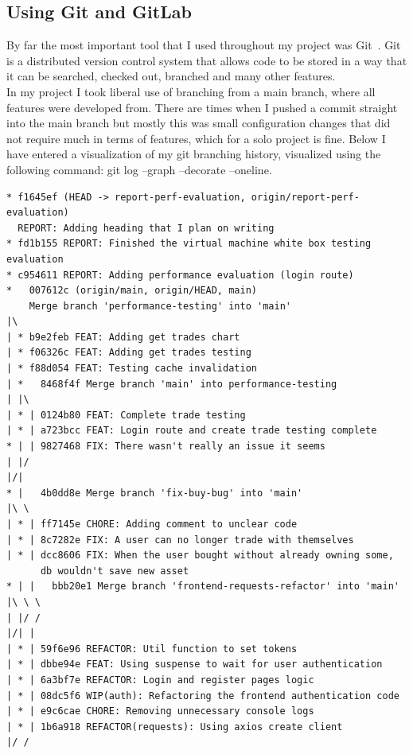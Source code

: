 \documentclass[titlepage]{article}
\begin{document}
\subsection{Using Git and GitLab}
By far the most important tool that I used throughout my project was Git~\cite{git}. Git is a distributed version control system that allows code to be stored in a way that it can be searched, checked out, branched and many other features. \\

In my project I took liberal use of branching from a main branch, where all features were developed from. There are times when I pushed a commit straight into the main branch but mostly this was small configuration changes that did not require much in terms of features, which for a solo project is fine. Below I have entered a visualization of my git branching history, visualized using the following command: git log --graph --decorate --oneline.

\begin{verbatim}
* f1645ef (HEAD -> report-perf-evaluation, origin/report-perf-evaluation) 
  REPORT: Adding heading that I plan on writing
* fd1b155 REPORT: Finished the virtual machine white box testing evaluation
* c954611 REPORT: Adding performance evaluation (login route)
*   007612c (origin/main, origin/HEAD, main) 
    Merge branch 'performance-testing' into 'main'
|\
| * b9e2feb FEAT: Adding get trades chart
| * f06326c FEAT: Adding get trades testing
| * f88d054 FEAT: Testing cache invalidation
| *   8468f4f Merge branch 'main' into performance-testing
| |\
| * | 0124b80 FEAT: Complete trade testing
| * | a723bcc FEAT: Login route and create trade testing complete
* | | 9827468 FIX: There wasn't really an issue it seems
| |/
|/|
* |   4b0dd8e Merge branch 'fix-buy-bug' into 'main'
|\ \
| * | ff7145e CHORE: Adding comment to unclear code
| * | 8c7282e FIX: A user can no longer trade with themselves
| * | dcc8606 FIX: When the user bought without already owning some,
      db wouldn't save new asset
* | |   bbb20e1 Merge branch 'frontend-requests-refactor' into 'main'
|\ \ \
| |/ /
|/| |
| * | 59f6e96 REFACTOR: Util function to set tokens
| * | dbbe94e FEAT: Using suspense to wait for user authentication
| * | 6a3bf7e REFACTOR: Login and register pages logic
| * | 08dc5f6 WIP(auth): Refactoring the frontend authentication code
| * | e9c6cae CHORE: Removing unnecessary console logs
| * | 1b6a918 REFACTOR(requests): Using axios create client
|/ /
\end{verbatim}
\end{document}
